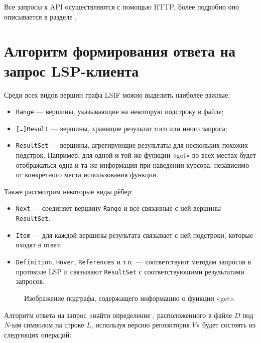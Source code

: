 Все запросы к API осуществляются с помощью HTTP. Более подробно оно описывается в разделе .

\section{Алгоритм формирования ответа на запрос LSP-клиента}
\label{lsp-algorithm}

Среди всех видов вершин графа \gls{LSIF} можно выделить наиболее важные:
\begin{itemize}
    \item \texttt{Range} — вершины, указывающие на некоторую подстроку в файле;
    \item \texttt{[…]Result} — вершины, хранящие результат того или иного запроса;
    \item \texttt{ResultSet} — вершины, агрегирующие результаты для нескольких похожих подстрок. Например, для одной и той же функции «get» во всех местах будет отображаться одна и та же информация при наведении курсора, независимо от конкретного места использования функции.
\end{itemize}

Также рассмотрим некоторые виды рёбер:

\begin{itemize}
    \item \texttt{Next} — соединяет вершину \texttt{Range} и все связанные с ней вершины \texttt{ResultSet}.
    \item \texttt{Item} — для каждой вершины-результата связывает с ней подстроки, которые входят в ответ.
    \item \texttt{Definition}, \texttt{Hover}, \texttt{References} и т.п. — соответствуют методам запросов в протоколе \gls{LSP} и связывают \texttt{ResultSet} с соответствующими результатами запросов.
\end{itemize}

\begin{figure}[H]
    \centering
    
    \caption{Изображение подграфа, содержащего информацию о функции «get».}
    \label{fig:lsif-graph}
\end{figure}

Алгоритм ответа на запрос «найти определение , расположенного в файле $D$ под $N$-ым символом на строке $L$, используя версию репозитория $V$» будет состоять из следующих операций:


